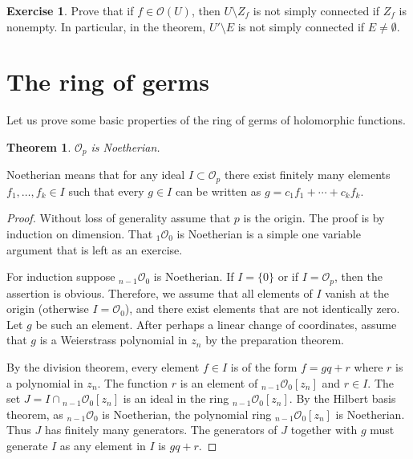 \documentclass[12pt,openany]{book}
\newcommand{\sO}{{\mathcal{O}}}
\newcommand{\sectionnewpage}{}
\theoremstyle{plain}
\newtheorem{thm}{Theorem}[section]
\theoremstyle{remark}
\theoremstyle{definition}
\newenvironment{exbox}{%
    \def\FrameCommand{\vrule width 1pt \relax\hspace {10pt}}%
    \MakeFramed {\advance \hsize -\width \FrameRestore }%
}{%
    \endMakeFramed
}
\theoremstyle{exercise}
\newtheorem{exercise}{Exercise}[section]
\theoremstyle{example}
\begin{document}
\begin{exbox}
\begin{exercise}
Prove that if $f \in \sO(U)$, then $U \setminus Z_f$ is not simply
connected if $Z_f$ is nonempty.  In particular, in the theorem, $U' \setminus E$ is not
simply connected if $E \not= \emptyset$.
\end{exercise}
\end{exbox}


\sectionnewpage
\section{The ring of germs} \label{sec:ring of germs}

Let us prove some basic properties of the
ring of germs of holomorphic functions.

\begin{thm}
$\sO_p$ is Noetherian.
\end{thm}

Noetherian means that for any ideal $I \subset \sO_p$
there exist finitely many elements $f_1,\ldots,f_k \in I$ such that
every $g \in I$ can be written as $g = c_1 f_1 + \cdots + c_k f_k$.

\begin{proof}
Without loss of generality assume that $p$ is the origin.  The proof is by
induction on dimension.  That ${}_1\sO_0$ is Noetherian is a simple one
variable argument that is left as an exercise.

For induction suppose ${}_{n-1}\sO_0$ is Noetherian.  If $I = \{ 0 \}$
or if $I = \sO_p$, then the assertion is obvious.  Therefore, we assume
that all elements of $I$ vanish at the origin (otherwise $I = \sO_0$), and
there exist elements that are not identically zero.  Let $g$
be such an element.  After perhaps a linear change of coordinates, 
assume that $g$ is a Weierstrass polynomial in $z_n$
by the preparation theorem.

By the division theorem,
every element $f \in I$ is of the form $f = gq+r$ where $r$
is a polynomial in $z_n$.  The function 
$r$ is an element of ${}_{n-1}\sO_0[z_n]$ and $r \in I$.
The set $J= I \cap {}_{n-1}\sO_0[z_n]$ is an ideal in the
ring ${}_{n-1}\sO_0[z_n]$.  By the Hilbert basis theorem, as
${}_{n-1}\sO_0$ is Noetherian, the polynomial ring
${}_{n-1}\sO_0[z_n]$ is Noetherian.  Thus $J$ has finitely many generators.
The generators of $J$ together with $g$ must generate $I$ as any
element in $I$ is $gq+r$.
\end{proof}
\end{document}
